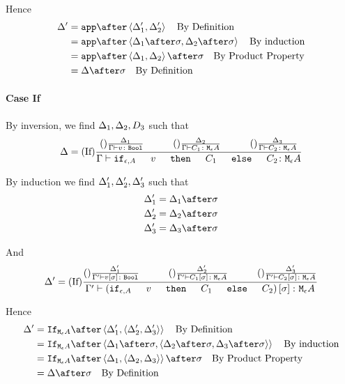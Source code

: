 {    Hence
    \begin{align}
        \D' &= \app\after\pr{\D_1'}{\D_2'}\qt{By Definition}\\
            &= \app\after\pr{\D_1\after\si}{\D_2\after\si}\qt{By induction}\\
            &= \app\after\pr{\D_1}{\D_2}\after\si\qt{By Product Property}\\
            & = \D\after\si\qt{By Definition}\\
    \end{align}

    \paragraph{Case If}


    By inversion, we find $\Delta_1, \Delta_2, D_3$ such that
    \begin{equation}
        \D = \treerule{If}{\treerule{}{\D_1}{\typerelation{\G}{v}{\B}}\s\s\treerule{}{\D_2}{\typerelation{\G}{C_1}{\mea}}\s\s\treerule{}{\D_3}{\typerelation{\G}{C_2}{\mea}}}{\typerelation{\G}{\ifthenelse{\e}{A}{v}{C_1}{C_2}}{\mea}}
    \end{equation}

    By induction we find $\Delta_1', \Delta_2', \Delta_3'$ such that 
    \begin{align}
        \D_1' &= \D_1\after\si\\
        \D_2' &= \D_2\after\si\\
        \D_3' &= \D_3\after\si\\
    \end{align}

    And
    \begin{equation}
        \D' = \treerule{If}{\treerule{}{\D_1'}{\typerelation{\G'}{v\ssi}{\B}}\s\s\treerule{}{\D_2'}{\typerelation{\G'}{C_1\ssi}{\mea}}\s\s\treerule{}{\D_3'}{\typerelation{\G'}{C_2\ssi}{\mea}}}{\typerelation{\G'}{(\ifthenelse{\e}{A}{v}{C_1}{C_2})\ssi}{\mea}}
    \end{equation}

    Hence
    \begin{align}
        \D' &= \ifnt{\mea}\after\pr{\D_1'}{\pr{\D_2'}{\D_3'}}\qt{By Definition}\\
            &= \ifnt{\mea}\after\pr{\D_1\after\si}{\pr{\D_2\after\si}{\D_3\after\si}}\qt{By induction}\\
            &= \ifnt{\mea}\after\pr{\D_1}{\pr{\D_2}{\D_3}}\after\si\qt{By Product Property}\\
            & = \D\after\si\qt{By Definition}\\
    \end{align}

}

